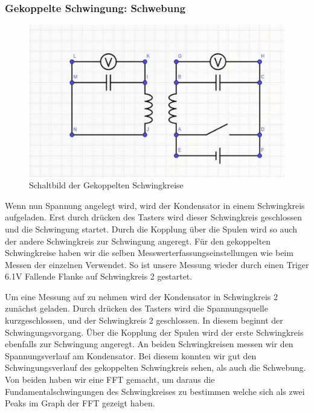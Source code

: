 \documentclass[twoside]{protokoll}
\begin{document}
\subsubsection{Gekoppelte Schwingung: Schwebung}

\begin{figure}[H]
    \centering
    \includegraphics[width=1\textwidth]{schaltplan-schwebung.pdf}
    \caption{Schaltbild der Gekoppelten Schwingkreise}
\end{figure}

Wenn nun Spannung angelegt wird, wird der Kondensator in einem Schwingkreis aufgeladen. 
Erst durch drücken des Tasters wird dieser Schwingkreis geschlossen und die Schwingung startet. 
Durch die Kopplung über die Spulen wird so auch der andere Schwingkreis zur Schwingung angeregt.
Für den gekoppelten Schwingkreise haben wir die selben Messwerterfassungseinstellungen wie beim Messen der einzelnen Verwendet. 
So ist unsere Messung wieder durch einen Triger 6.1V Fallende Flanke auf Schwingkreis 2 gestartet.

Um eine Messung auf zu nehmen wird der Kondensator in Schwingkreis 2 zunächst geladen.
Durch drücken des Tasters wird die Spannungsquelle kurzgeschlossen, und der Schwingkreis 2 geschlossen. In diesem beginnt der Schwingungsvorgang.
Über die Kopplung der Spulen wird der erste Schwingkreis ebenfalls zur Schwingung angeregt. An beiden Schwingkreisen messen wir den Spannungsverlauf am Kondensator. 
Bei diesem konnten wir gut den Schwingungsverlauf des gekoppelten Schwingkreis sehen, als auch die Schwebung. 
Von beiden haben wir eine FFT gemacht, um daraus die Fundamentalschwingungen des Schwingkreises zu bestimmen welche sich als zwei Peaks im Graph der FFT gezeigt haben.\\ 
\end{document}
